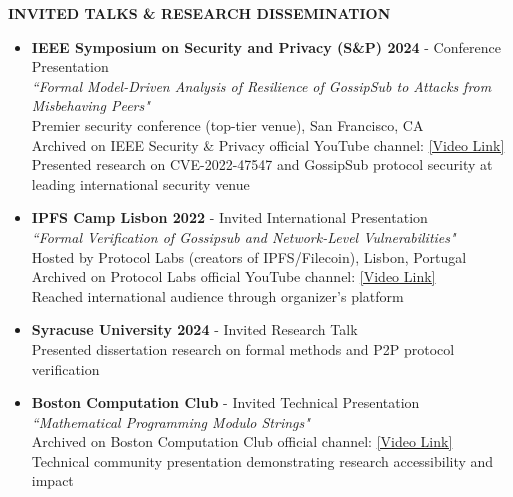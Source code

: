 \documentclass[11pt,letterpaper]{article}
\newcommand{\cvsection}[1]{
    \vspace{0.6em}
    {\color{darkblue}\textbf{\Large #1}}
    \vspace{0.15em}
    \textcolor{lightblue}{\hrulefill}
    \vspace{0.4em}
}
\begin{document}
\cvsection{INVITED TALKS \& RESEARCH DISSEMINATION}
\begin{itemize}
    \item \textbf{IEEE Symposium on Security and Privacy (S\&P) 2024} - Conference Presentation \\
          \textit{``Formal Model-Driven Analysis of Resilience of GossipSub to Attacks from Misbehaving Peers"} \\
          Premier security conference (top-tier venue), San Francisco, CA \\
          Archived on IEEE Security \& Privacy official YouTube channel: \href{https://www.youtube.com/watch?v=Ax__H_N0B1E}{[Video Link]} \\
          Presented research on CVE-2022-47547 and GossipSub protocol security at leading international security venue

    \item \textbf{IPFS Camp Lisbon 2022} - Invited International Presentation \\
          \textit{``Formal Verification of Gossipsub and Network-Level Vulnerabilities"} \\
          Hosted by Protocol Labs (creators of IPFS/Filecoin), Lisbon, Portugal \\
          Archived on Protocol Labs official YouTube channel: \href{https://www.youtube.com/watch?v=T3QLhijHAwA}{[Video Link]} \\
          Reached international audience through organizer's platform
    
    \item \textbf{Syracuse University 2024} - Invited Research Talk \\
          Presented dissertation research on formal methods and P2P protocol verification
    
    \item \textbf{Boston Computation Club} - Invited Technical Presentation \\
          \textit{``Mathematical Programming Modulo Strings"} \\
          Archived on Boston Computation Club official channel: \href{https://www.youtube.com/watch?v=doeauZv3JrE}{[Video Link]} \\
          Technical community presentation demonstrating research accessibility and impact
\end{itemize}
\end{document}
